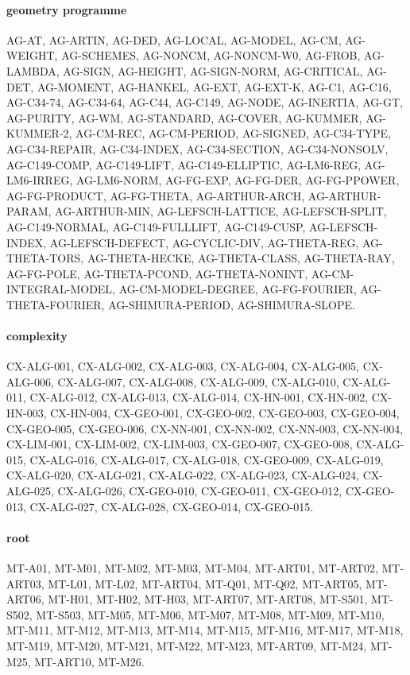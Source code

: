 \documentclass[11pt,a4paper]{article}
\begin{document}
\paragraph{geometry programme} AG-AT, AG-ARTIN, AG-DED, AG-LOCAL, AG-MODEL, AG-CM, AG-WEIGHT, AG-SCHEMES, AG-NONCM, AG-NONCM-W0, AG-FROB, AG-LAMBDA, AG-SIGN, AG-HEIGHT, AG-SIGN-NORM, AG-CRITICAL, AG-DET, AG-MOMENT, AG-HANKEL, AG-EXT, AG-EXT-K, AG-C1, AG-C16, AG-C34-74, AG-C34-64, AG-C44, AG-C149, AG-NODE, AG-INERTIA, AG-GT, AG-PURITY, AG-WM, AG-STANDARD, AG-COVER, AG-KUMMER, AG-KUMMER-2, AG-CM-REC, AG-CM-PERIOD, AG-SIGNED, AG-C34-TYPE, AG-C34-REPAIR, AG-C34-INDEX, AG-C34-SECTION, AG-C34-NONSOLV, AG-C149-COMP, AG-C149-LIFT, AG-C149-ELLIPTIC, AG-LM6-REG, AG-LM6-IRREG, AG-LM6-NORM, AG-FG-EXP, AG-FG-DER, AG-FG-PPOWER, AG-FG-PRODUCT, AG-FG-THETA, AG-ARTHUR-ARCH, AG-ARTHUR-PARAM, AG-ARTHUR-MIN, AG-LEFSCH-LATTICE, AG-LEFSCH-SPLIT, AG-C149-NORMAL, AG-C149-FULLLIFT, AG-C149-CUSP, AG-LEFSCH-INDEX, AG-LEFSCH-DEFECT, AG-CYCLIC-DIV, AG-THETA-REG, AG-THETA-TORS, AG-THETA-HECKE, AG-THETA-CLASS, AG-THETA-RAY, AG-FG-POLE, AG-THETA-PCOND, AG-THETA-NONINT, AG-CM-INTEGRAL-MODEL, AG-CM-MODEL-DEGREE, AG-FG-FOURIER, AG-THETA-FOURIER, AG-SHIMURA-PERIOD, AG-SHIMURA-SLOPE.
\paragraph{complexity} CX-ALG-001, CX-ALG-002, CX-ALG-003, CX-ALG-004, CX-ALG-005, CX-ALG-006, CX-ALG-007, CX-ALG-008, CX-ALG-009, CX-ALG-010, CX-ALG-011, CX-ALG-012, CX-ALG-013, CX-ALG-014, CX-HN-001, CX-HN-002, CX-HN-003, CX-HN-004, CX-GEO-001, CX-GEO-002, CX-GEO-003, CX-GEO-004, CX-GEO-005, CX-GEO-006, CX-NN-001, CX-NN-002, CX-NN-003, CX-NN-004, CX-LIM-001, CX-LIM-002, CX-LIM-003, CX-GEO-007, CX-GEO-008, CX-ALG-015, CX-ALG-016, CX-ALG-017, CX-ALG-018, CX-GEO-009, CX-ALG-019, CX-ALG-020, CX-ALG-021, CX-ALG-022, CX-ALG-023, CX-ALG-024, CX-ALG-025, CX-ALG-026, CX-GEO-010, CX-GEO-011, CX-GEO-012, CX-GEO-013, CX-ALG-027, CX-ALG-028, CX-GEO-014, CX-GEO-015.
\paragraph{root} MT-A01, MT-M01, MT-M02, MT-M03, MT-M04, MT-ART01, MT-ART02, MT-ART03, MT-L01, MT-L02, MT-ART04, MT-Q01, MT-Q02, MT-ART05, MT-ART06, MT-H01, MT-H02, MT-H03, MT-ART07, MT-ART08, MT-S501, MT-S502, MT-S503, MT-M05, MT-M06, MT-M07, MT-M08, MT-M09, MT-M10, MT-M11, MT-M12, MT-M13, MT-M14, MT-M15, MT-M16, MT-M17, MT-M18, MT-M19, MT-M20, MT-M21, MT-M22, MT-M23, MT-ART09, MT-M24, MT-M25, MT-ART10, MT-M26.
\end{document}
